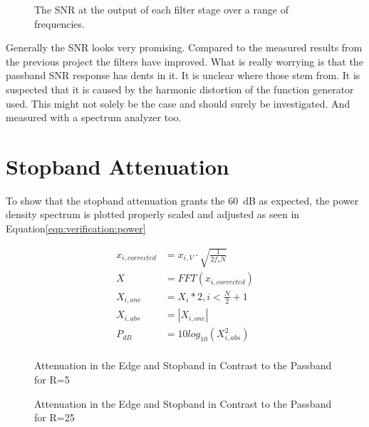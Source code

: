 \begin{figure}
    \centering
    
    \caption[The SNR at the output of each filter stage over a range of frequencies.]{%
        The SNR at the output of each filter stage over a range of frequencies.%
    }
    \label{fig:verification:rmsAll}
\end{figure}

Generally the SNR looks very promising. Compared to the measured results from the previous project the filters have improved.
What is really worrying is that the passband SNR response has dents in it.
It is unclear where those stem from. It is suspected that it is caused by the harmonic distortion of the function generator used. This might not solely be the case and should surely be investigated. And measured with a spectrum analyzer too.

\section{Stopband Attenuation}
\label{sec:verification:snr}

To show that the stopband attenuation grants the \SI{60}{\dB} as expected, the power density spectrum is plotted properly scaled and adjusted as seen in Equation\ref{eqn:verification:power}

\begin{align}
    \label{eqn:verification:power}
    x_{i,corrected} &= x_{i,V} \cdot \sqrt{\frac{1}{2f_sN}}\\
    X &= FFT(x_{i,corrected})\\
    X_{i,one} &= X_i * 2, i < \frac{N}{2}+1\\
    X_{i,abs} &= |X_{i,one}|\\
    P_{dB} &= 10log_{10}(X_{i,abs}^2)\\
\end{align}



\begin{figure}
    \centering
    
    \caption[Attenuation in the Edge and Stopband in Contrast to the Passband for R=5]{%
    Attenuation in the Edge and Stopband in Contrast to the Passband for R=5%
    }
    \label{fig:verification:fB5}
\end{figure}

\begin{figure}
    \centering
    
    \caption[Attenuation in the Edge and Stopband in Contrast to the Passband for R=25]{%
    Attenuation in the Edge and Stopband in Contrast to the Passband for R=25%
    }
    \label{fig:verification:fB25}
\end{figure}

